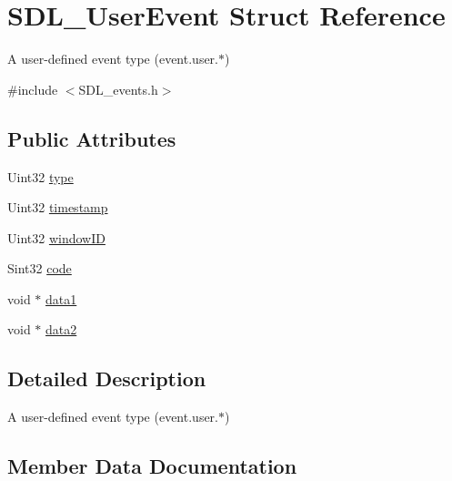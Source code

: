 \hypertarget{struct_s_d_l___user_event}{}\section{S\+D\+L\+\_\+\+User\+Event Struct Reference}
\label{struct_s_d_l___user_event}


A user-\/defined event type (event.\+user.$\ast$)  




{\ttfamily \#include $<$S\+D\+L\+\_\+events.\+h$>$}

\subsection*{Public Attributes}
\begin{DoxyCompactItemize}
\item 
Uint32 \mbox{\hyperlink{struct_s_d_l___user_event_ab7afa8b98dbd7b52bef41155e10f7340}{type}}
\item 
Uint32 \mbox{\hyperlink{struct_s_d_l___user_event_adbf1d34c73138a0c549310e5d4ad0c35}{timestamp}}
\item 
Uint32 \mbox{\hyperlink{struct_s_d_l___user_event_abccefa10e0e0e3a0801bc6d836a08da7}{window\+ID}}
\item 
Sint32 \mbox{\hyperlink{struct_s_d_l___user_event_aef47976781ee82b527a353c5acfa0a34}{code}}
\item 
void $\ast$ \mbox{\hyperlink{struct_s_d_l___user_event_ab2893a12be2f97195f16463a23107913}{data1}}
\item 
void $\ast$ \mbox{\hyperlink{struct_s_d_l___user_event_aae4dbf65c34d654c9edf519eb061b7cf}{data2}}
\end{DoxyCompactItemize}


\subsection{Detailed Description}
A user-\/defined event type (event.\+user.$\ast$) 

\subsection{Member Data Documentation}
\mbox{\label{struct_s_d_l___user_event_aef47976781ee82b527a353c5acfa0a34}} 
